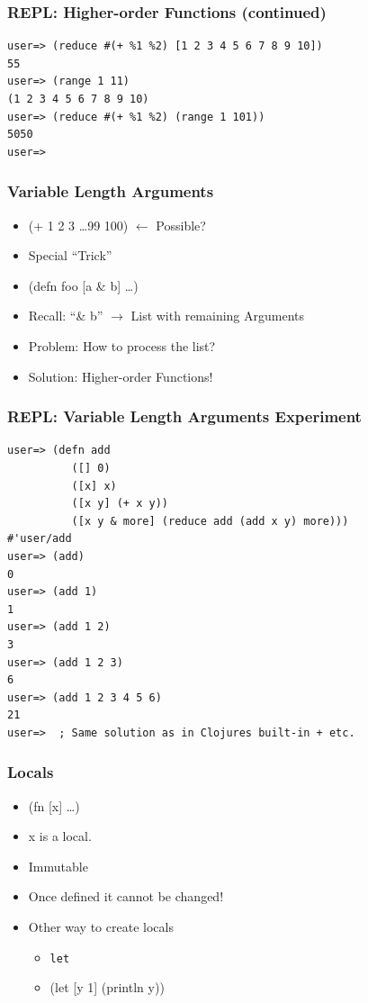 \documentclass{beamer}
\begin{document}
\begin{frame}[fragile]
\frametitle{REPL: Higher-order Functions (continued)}
\begin{lstlisting}[basicstyle=\scriptsize]
user=> (reduce #(+ %1 %2) [1 2 3 4 5 6 7 8 9 10])
55
user=> (range 1 11)
(1 2 3 4 5 6 7 8 9 10)
user=> (reduce #(+ %1 %2) (range 1 101))
5050
user=>  
\end{lstlisting}
\end{frame}

  \begin{frame}
      \frametitle{Variable Length Arguments}

      \begin{itemize}
          \item (+ 1 2 3 \ldots 99 100) $\leftarrow$ Possible?
          \item Special ``Trick''
          \item (defn foo [a \& b] \ldots)
          \item Recall: ``\& b'' $\rightarrow$ List with remaining Arguments
          \item Problem: How to process the list?
          \item Solution: Higher-order Functions!
      \end{itemize}
  \end{frame}

\begin{frame}[fragile]
\frametitle{REPL: Variable Length Arguments Experiment}
\begin{lstlisting}[basicstyle=\scriptsize]
user=> (defn add
          ([] 0)
          ([x] x)
          ([x y] (+ x y))
          ([x y & more] (reduce add (add x y) more)))
#'user/add
user=> (add)
0
user=> (add 1)
1
user=> (add 1 2)
3
user=> (add 1 2 3)
6
user=> (add 1 2 3 4 5 6)
21
user=>  ; Same solution as in Clojures built-in + etc.
\end{lstlisting}
\end{frame}

  \begin{frame}
      \frametitle{Locals}

      \begin{itemize}
          \item (fn [x] \ldots)
          \item x is a local.
          \item Immutable
          \item Once defined it cannot be changed!
          \item Other way to create locals
              \begin{itemize}
                  \item \texttt{let}
                  \item (let [y 1] (println y))
              \end{itemize}
      \end{itemize}
  \end{frame}
\end{document}
